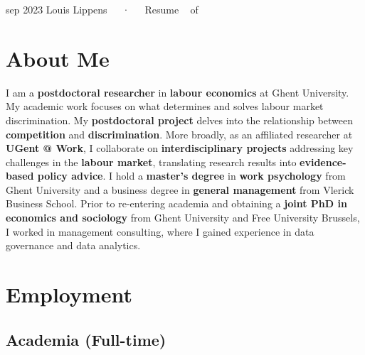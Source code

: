 \documentclass[11pt,a4paper,]{awesome-cv}
\begin{document}
\makecvheader

\makecvfooter
  {sep 2023}
    {Louis Lippens~~~·~~~Resume}
  {\thepage~ of \pageref{LastPage}~}





\hypertarget{about-me}{%
\section{About Me}\label{about-me}}

\footnotesize

I am a \textbf{postdoctoral researcher} in \textbf{labour economics} at
Ghent University. My academic work focuses on what determines and solves
labour market discrimination. My \textbf{postdoctoral project} delves
into the relationship between \textbf{competition} and
\textbf{discrimination}. More broadly, as an affiliated researcher at
\textbf{UGent @ Work}, I collaborate on \textbf{interdisciplinary
projects} addressing key challenges in the \textbf{labour market},
translating research results into \textbf{evidence-based policy advice}.
I hold a \textbf{master's degree} in \textbf{work psychology} from Ghent
University and a business degree in \textbf{general management} from
Vlerick Business School. Prior to re-entering academia and obtaining a
\textbf{joint PhD in economics and sociology} from Ghent University and
Free University Brussels, I worked in management consulting, where I
gained experience in data governance and data analytics. \normalsize

\hypertarget{employment}{%
\section{Employment}\label{employment}}

\medskip

\hypertarget{academia-full-time}{%
\subsection{Academia (Full-time)}\label{academia-full-time}}
\end{document}
